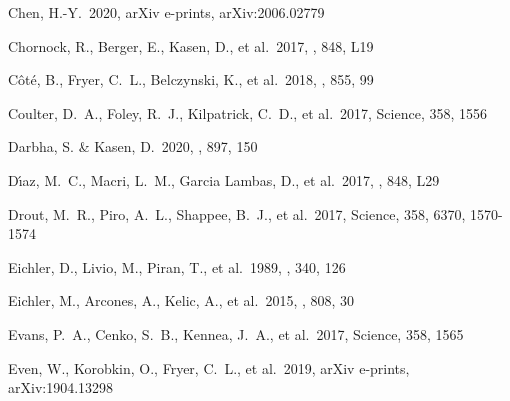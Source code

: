 \documentclass[twocolumn]{aastex63}
\begin{document}
\begin{thebibliography}{}

 Chen, H.-Y.\ 2020, arXiv e-prints, arXiv:2006.02779

 Chornock, R., Berger, E., Kasen, D., et al.\ 2017, \apjl, 848, L19



 C{\^o}t{\'e}, B., Fryer, C.~L., Belczynski, K., et al.\ 2018, \apj, 855, 99

 Coulter, D.~A., Foley, R.~J., Kilpatrick, C.~D., et al.\ 2017, Science, 358, 1556

 Darbha, S. \& Kasen, D.\ 2020, \apj, 897, 150


 D{\'\i}az, M.~C., Macri, L.~M., Garcia Lambas, D., et al.\ 2017, \apjl, 848, L29

 Drout, M.~R., Piro, A.~L., Shappee, B.~J., et al.\ 2017, Science, 358, 6370, 1570-1574

 Eichler, D., Livio, M., Piran, T., et al.\ 1989, \nat, 340, 126

 Eichler, M., Arcones, A., Kelic, A., et al.\ 2015, \apj, 808, 30


 Evans, P.~A., Cenko, S.~B., Kennea, J.~A., et al.\ 2017, Science, 358, 1565

 Even, W., Korobkin, O., Fryer, C.~L., et al.\ 2019, arXiv e-prints, arXiv:1904.13298




\end{thebibliography}
\end{document}
